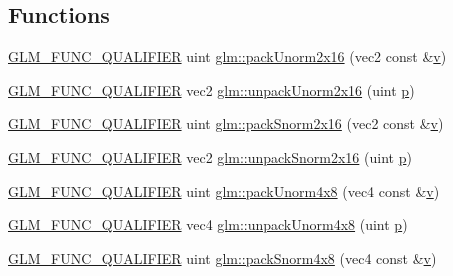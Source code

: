 \subsection*{Functions}
\begin{DoxyCompactItemize}
\item 
\mbox{\hyperlink{setup_8hpp_a33fdea6f91c5f834105f7415e2a64407}{G\+L\+M\+\_\+\+F\+U\+N\+C\+\_\+\+Q\+U\+A\+L\+I\+F\+I\+ER}} uint \mbox{\hyperlink{group__core__func__packing_ga0e2d107039fe608a209497af867b85fb}{glm\+::pack\+Unorm2x16}} (vec2 const \&\mbox{\hyperlink{_s_d_l__opengl_8h_a10a82eabcb59d2fcd74acee063775f90}{v}})
\item 
\mbox{\hyperlink{setup_8hpp_a33fdea6f91c5f834105f7415e2a64407}{G\+L\+M\+\_\+\+F\+U\+N\+C\+\_\+\+Q\+U\+A\+L\+I\+F\+I\+ER}} vec2 \mbox{\hyperlink{group__core__func__packing_ga1f66188e5d65afeb9ffba1ad971e4007}{glm\+::unpack\+Unorm2x16}} (uint \mbox{\hyperlink{_s_d_l__opengl__glext_8h_aa5367c14d90f462230c2611b81b41d23}{p}})
\item 
\mbox{\hyperlink{setup_8hpp_a33fdea6f91c5f834105f7415e2a64407}{G\+L\+M\+\_\+\+F\+U\+N\+C\+\_\+\+Q\+U\+A\+L\+I\+F\+I\+ER}} uint \mbox{\hyperlink{group__core__func__packing_ga977ab172da5494e5ac63e952afacfbe2}{glm\+::pack\+Snorm2x16}} (vec2 const \&\mbox{\hyperlink{_s_d_l__opengl_8h_a10a82eabcb59d2fcd74acee063775f90}{v}})
\item 
\mbox{\hyperlink{setup_8hpp_a33fdea6f91c5f834105f7415e2a64407}{G\+L\+M\+\_\+\+F\+U\+N\+C\+\_\+\+Q\+U\+A\+L\+I\+F\+I\+ER}} vec2 \mbox{\hyperlink{group__core__func__packing_gacd8f8971a3fe28418be0d0fa1f786b38}{glm\+::unpack\+Snorm2x16}} (uint \mbox{\hyperlink{_s_d_l__opengl__glext_8h_aa5367c14d90f462230c2611b81b41d23}{p}})
\item 
\mbox{\hyperlink{setup_8hpp_a33fdea6f91c5f834105f7415e2a64407}{G\+L\+M\+\_\+\+F\+U\+N\+C\+\_\+\+Q\+U\+A\+L\+I\+F\+I\+ER}} uint \mbox{\hyperlink{group__core__func__packing_gaf7d2f7341a9eeb4a436929d6f9ad08f2}{glm\+::pack\+Unorm4x8}} (vec4 const \&\mbox{\hyperlink{_s_d_l__opengl_8h_a10a82eabcb59d2fcd74acee063775f90}{v}})
\item 
\mbox{\hyperlink{setup_8hpp_a33fdea6f91c5f834105f7415e2a64407}{G\+L\+M\+\_\+\+F\+U\+N\+C\+\_\+\+Q\+U\+A\+L\+I\+F\+I\+ER}} vec4 \mbox{\hyperlink{group__core__func__packing_ga7f903259150b67e9466f5f8edffcd197}{glm\+::unpack\+Unorm4x8}} (uint \mbox{\hyperlink{_s_d_l__opengl__glext_8h_aa5367c14d90f462230c2611b81b41d23}{p}})
\item 
\mbox{\hyperlink{setup_8hpp_a33fdea6f91c5f834105f7415e2a64407}{G\+L\+M\+\_\+\+F\+U\+N\+C\+\_\+\+Q\+U\+A\+L\+I\+F\+I\+ER}} uint \mbox{\hyperlink{group__core__func__packing_ga85e8f17627516445026ab7a9c2e3531a}{glm\+::pack\+Snorm4x8}} (vec4 const \&\mbox{\hyperlink{_s_d_l__opengl_8h_a10a82eabcb59d2fcd74acee063775f90}{v}})

\end{DoxyCompactItemize}
